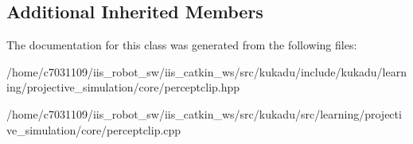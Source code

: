 \subsection*{Additional Inherited Members}


The documentation for this class was generated from the following files\-:\begin{DoxyCompactItemize}
\item 
/home/c7031109/iis\-\_\-robot\-\_\-sw/iis\-\_\-catkin\-\_\-ws/src/kukadu/include/kukadu/learning/projective\-\_\-simulation/core/perceptclip.\-hpp\item 
/home/c7031109/iis\-\_\-robot\-\_\-sw/iis\-\_\-catkin\-\_\-ws/src/kukadu/src/learning/projective\-\_\-simulation/core/perceptclip.\-cpp\end{DoxyCompactItemize}
